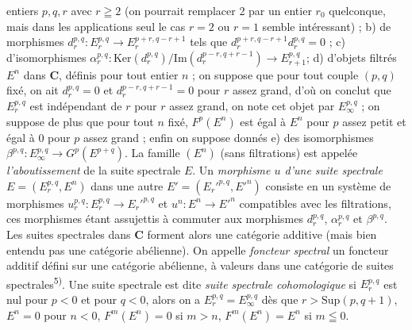 entiers $p,q,r$ avec $r\geqq2$ (on pourrait remplacer 2 par un entier $r_0$
quelconque, mais dans les applications seul le cas $r=2$ ou $r=1$ semble
intéressant) ; b) de morphismes
$d_r^{p,q}:E_r^{p,q}\to E_r^{p+r,q-r+1}$
tels que $d_r^{p+r,q-r+1}d_r^{p,q}=0$ ; c) d'isomorphismes
$\alpha_r^{p,q}:
\mathrm{Ker}(d_r^{p,q})/\mathrm{Im}(d_r^{p-r,q+r-1})
\to E_{r+1}^{p,q}$;
d) d'objets filtrés $E^n$ dans $\mathbf{C}$, définis pour tout entier $n$ ; on suppose
que pour tout couple $(p,q)$ fixé, on ait $d_r^{p,q}=0$ et
$d_r^{p-r,q+r-1}=0$ pour $r$ assez grand, d'où on conclut que $E_r^{p,q}$ est
indépendant de $r$ pour $r$ assez grand, on note cet objet par
$E_\infty^{p,q}$ ; on suppose de plus que pour tout $n$ fixé, $F^p(E^n)$ est
égal à $E^n$ pour $p$ assez petit et égal à 0 pour $p$ assez grand ; enfin on
suppose donnés e) des isomorphismes
$\beta^{p,q}:E_\infty^{p,q}\to G^p(E^{p+q})$.
La famille $(E^n)$ (sans filtrations) est appelée \textit{l'aboutissement} de
la suite spectrale $E$.
Un \textit{morphisme $u$ d'une suite spectrale}
$E=(E_r^{p,q},E^n)$ dans une autre $E'=(E_r'^{p,q},E'^n)$ consiste en un
système de morphismes
$u_r^{p,q}:E_r^{p,q}\to E_r'^{p,q}$ et
$u^n:E^n\to E'^n$ compatibles avec les filtrations, ces morphismes
étant assujettis à commuter aux morphismes $d_r^{p,q}$,
$\alpha_r^{p,q}$ et $\beta^{p,q}$. Les suites spectrales dans $\mathbf{C}$ forment alors
une catégorie additive (mais bien entendu pas une catégorie abélienne).
On appelle \textit{foncteur spectral} un foncteur additif défini sur une
catégorie abélienne, à valeurs dans une catégorie de suites
spectrales\textsuperscript{5)}.
Une suite spectrale est dite \textit{suite spectrale cohomologique} si
$E_r^{p,q}$ est nul pour $p<0$ et pour $q<0$, alors on a
$E_r^{p,q}=E_\infty^{p,q}$ dès que $r>\mathrm{Sup}(p,q+1)$, $E^n=0$ pour
$n<0$, $F^m(E^n)=0$ si $m>n$, $F^m(E^n)=E^n$ si $m\leqq0$.

